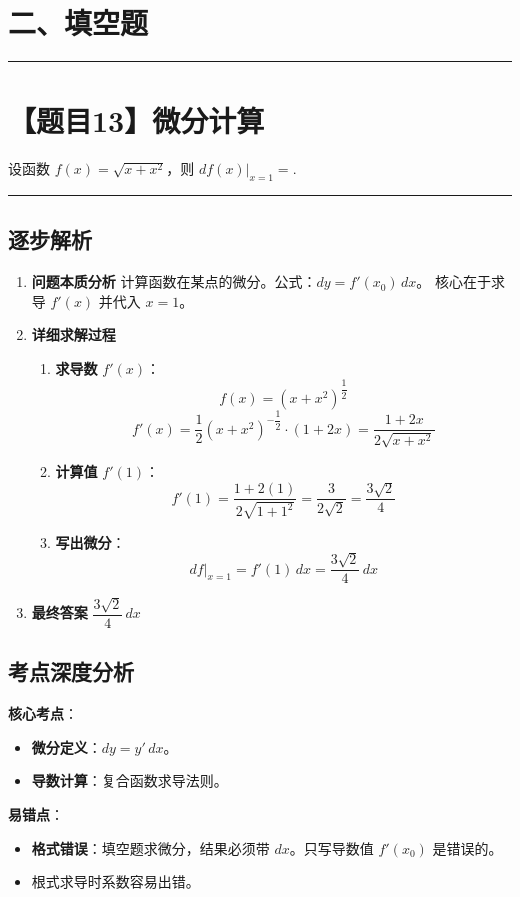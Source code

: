 \documentclass[UTF8,10pt]{ctexart}
\newenvironment{redenv}{\color{red}}{}
\newenvironment{detailedanalysis}{%
    \color{red}
    \begin{enumerate}[label=\textbf{第\arabic*步：}, leftmargin=*, align=left, itemsep=0pt, parsep=0pt, topsep=0pt, partopsep=0pt]
}{%
    \end{enumerate}
}
\newenvironment{conceptbox}{%
    \begin{tcolorbox}[colback=red!5, colframe=red!50!black, title=概念解析, fonttitle=\bfseries, top=2pt, bottom=2pt, left=2pt, right=2pt]
}{%
    \end{tcolorbox}
}
\newcommand{\problemrule}{\par\filbreak\noindent\rule{\textwidth}{1.5pt}\vspace{-0.5em}}
\newcommand{\analysisrule}{\noindent\rule{\textwidth}{0.8pt}\vspace{-0.5em}}
\begin{document}
\section*{二、填空题}

\problemrule
\section*{【题目13】微分计算}
设函数 $f(x) = \sqrt{x+x^2}$，则 $df(x)|_{x=1} = $\underline{\hspace{4cm}}.

\begin{redenv}
\analysisrule
\subsection*{逐步解析}

\begin{detailedanalysis}
\item \textbf{问题本质分析}
计算函数在某点的微分。公式：$dy = f'(x_0)\, dx$。
核心在于求导 $f'(x)$ 并代入 $x=1$。

\item \textbf{详细求解过程}
\begin{enumerate}[label=(\alph*)]
    \item \textbf{求导数} $f'(x)$：
    \[ f(x) = (x+x^2)^{\dfrac{1}{2}} \]
    \[ f'(x) = \dfrac{1}{2}(x+x^2)^{-\dfrac{1}{2}} \cdot (1+2x) = \dfrac{1+2x}{2\sqrt{x+x^2}} \]
    \item \textbf{计算值} $f'(1)$：
    \[ f'(1) = \dfrac{1+2(1)}{2\sqrt{1+1^2}} = \dfrac{3}{2\sqrt{2}} = \dfrac{3\sqrt{2}}{4} \]
    \item \textbf{写出微分}：
    \[ df|_{x=1} = f'(1)\, dx = \dfrac{3\sqrt{2}}{4}\, dx \]
\end{enumerate}

\item \textbf{最终答案}
$\dfrac{3\sqrt{2}}{4}\, dx$
\end{detailedanalysis}

\subsection*{考点深度分析}
\begin{conceptbox}
\textbf{核心考点}：
\begin{itemize}
    \item \textbf{微分定义}：$dy = y'\, dx$。
    \item \textbf{导数计算}：复合函数求导法则。
\end{itemize}
\textbf{易错点}：
\begin{itemize}
    \item \textbf{格式错误}：填空题求微分，结果必须带 $dx$。只写导数值 $f'(x_0)$ 是错误的。
    \item 根式求导时系数容易出错。
\end{itemize}
\end{conceptbox}
\end{redenv}
\end{document}
